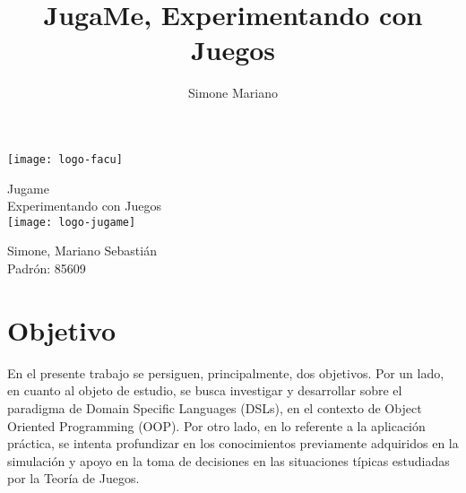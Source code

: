 \documentclass[10pt]{article}
\title{JugaMe, Experimentando con Juegos}
\author{Simone Mariano}
\numberwithin{equation}{section}
\numberwithin{figure}{section}
\numberwithin{table}{section}
\begin{document}
\renewcommand{\tablename}{Tabla}

%
%
\pagestyle{fancy}
\renewcommand{\sectionmark}[1]{\markboth{}{\thesection\ \ #1}}
\lhead{}
\chead{}
\rhead{\rightmark}
\lfoot{}
\cfoot{}
\rfoot{\thepage}

%
%
\begin{titlepage}
%
%
	\thispagestyle{empty}
%
%
	\texttt{[image: logo-facu]}
	\vfill
%
%
	\begin{center}
		\Huge{Jugame}\\
		\vspace{1cm}
		\LARGE{Experimentando con Juegos}\\
		\vspace{1cm}
		\texttt{[image: logo-jugame]}
	\end{center}
	\vspace{2cm}
%
%
	\large{
			Simone, Mariano Sebastián\\
			Padrón: 85609\\		
	}
	\vfill
%
%
\end{titlepage}

%
%
\setcounter{page}{1}

%
%
\tableofcontents
\newpage


\section{Objetivo}
En el presente trabajo se persiguen, principalmente, dos objetivos.
Por un lado, en cuanto al objeto de estudio, se busca investigar y desarrollar sobre el paradigma de Domain Specific Languages (DSLs), en el contexto de Object Oriented Programming (OOP).
Por otro lado, en lo referente a la aplicación práctica, se intenta profundizar en los conocimientos previamente adquiridos en la simulación y apoyo en la toma de decisiones en las situaciones típicas estudiadas por la Teoría de Juegos.
\end{document}
